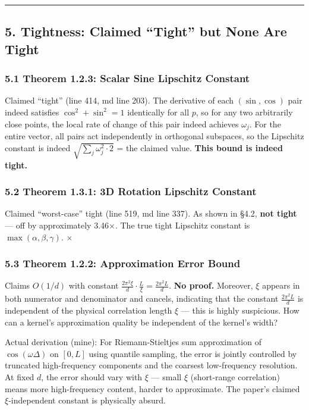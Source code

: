 \documentclass[
  12pt,
]{article}
\begin{document}
\begin{center}\rule{0.5\linewidth}{0.5pt}\end{center}

\subsection{5. Tightness: Claimed ``Tight'' but None Are Tight}\label{tightness-none-tight}

\subsubsection{5.1 Theorem 1.2.3: Scalar Sine Lipschitz Constant}\label{thm-1.2.3-tight}

Claimed ``tight'' (line 414, md line 203). The derivative of each $(\sin,\cos)$ pair indeed satisfies $\cos^2 + \sin^2 = 1$ identically for all $p$, so for any two arbitrarily close points, the local rate of change of this pair indeed achieves $\omega_j$. For the entire vector, all pairs act independently in orthogonal subspaces, so the Lipschitz constant is indeed $\sqrt{\sum_j \omega_j^2 \cdot 2}$ = the claimed value. \textbf{This bound is indeed tight.} \checkmark

\subsubsection{5.2 Theorem 1.3.1: 3D Rotation Lipschitz Constant}\label{thm-1.3.1-tight}

Claimed ``worst-case'' tight (line 519, md line 337). As shown in \S4.2, \textbf{not tight} --- off by approximately 3.46$\times$. The true tight Lipschitz constant is $\max(\alpha, \beta, \gamma)$. $\times$

\subsubsection{5.3 Theorem 1.2.2: Approximation Error Bound}\label{thm-1.2.2-tight}

Claims $O(1/d)$ with constant $\frac{2\pi^2\xi}{d} \cdot \frac{L}{\xi} = \frac{2\pi^2 L}{d}$. \textbf{No proof.} Moreover, $\xi$ appears in both numerator and denominator and cancels, indicating that the constant $\frac{2\pi^2 L}{d}$ is independent of the physical correlation length $\xi$ --- this is highly suspicious. How can a kernel's approximation quality be independent of the kernel's width?

Actual derivation (mine): For Riemann-Stieltjes sum approximation of $\cos(\omega\Delta)$ on $[0,L]$ using quantile sampling, the error is jointly controlled by truncated high-frequency components and the coarsest low-frequency resolution. At fixed $d$, the error should vary with $\xi$ --- small $\xi$ (short-range correlation) means more high-frequency content, harder to approximate. The paper's claimed $\xi$-independent constant is physically absurd.
\end{document}

